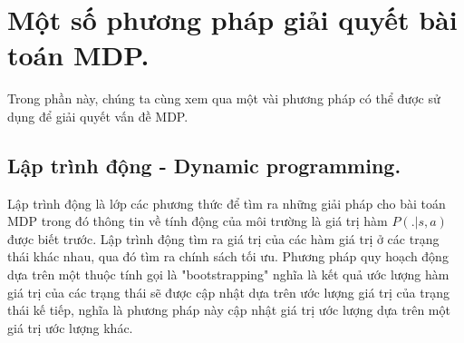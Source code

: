 \documentclass{uetgraduation}
\begin{document}
\section{Một số phương pháp giải quyết bài toán MDP.}
Trong phần này, chúng ta cùng xem qua một vài phương pháp có thể được sử dụng để giải quyết vấn đề MDP.

\subsection{Lập trình động - Dynamic programming.}
Lập trình động là lớp các phương thức để tìm ra những giải pháp cho bài toán MDP trong đó thông tin về tính động của môi trường là giá trị hàm $P(.|s, a)$ được biết trước. Lập trình động tìm ra
giá trị của các hàm giá trị ở các trạng thái khác nhau, qua đó tìm ra chính sách tối ưu. Phương pháp quy hoạch động dựa trên một thuộc tính gọi là "bootstrapping" nghĩa là kết quả ước lượng hàm giá trị của
các trạng thái sẽ được cập nhật dựa trên ước lượng giá trị của trạng thái kế tiếp, nghĩa là phương pháp này cập nhật giá trị ước lượng dựa trên một giá trị ước lượng khác.
\end{document}
